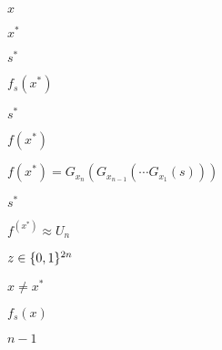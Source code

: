 \documentclass[10pt]{book}
\begin{document}
\begin{mdSnippets}
\begin{mdInlineSnippet}[9dd4e461268c8034f5c8564e155c67a6]%
$x$\end{mdInlineSnippet}%
\begin{mdInlineSnippet}[5d9075efa0ec4b2e8228505844f11742]%
$x^*$\end{mdInlineSnippet}%
\begin{mdInlineSnippet}[a4f30b4084dd8599723853c370c75cc9]%
$s^*$\end{mdInlineSnippet}%
\begin{mdInlineSnippet}[d05500aa6c9c5acde0f7847030f992fd]%
$f_s(x^*)$\end{mdInlineSnippet}%
\begin{mdInlineSnippet}[a4f30b4084dd8599723853c370c75cc9]%
$s^*$\end{mdInlineSnippet}%
\begin{mdInlineSnippet}[b2ff665e53fd029b9e15d9d06fa5e9f3]%
$f(x^*)$\end{mdInlineSnippet}%
\begin{mdInlineSnippet}%
$f(x^*) = G_{x_n}(G_{x_{n-1}}(\cdots G_{x_1}(s)))$\end{mdInlineSnippet}%
\begin{mdInlineSnippet}[a4f30b4084dd8599723853c370c75cc9]%
$s^*$\end{mdInlineSnippet}%
\begin{mdInlineSnippet}[296104cbd2b71c2b5c16c11e9c45a162]%
$f^(x^*) \approx U_n$\end{mdInlineSnippet}%
\begin{mdInlineSnippet}[d8d9fd5e4b4fc57a850dc6cd573edece]%
$z \in \{0,1\}^{2n}$\end{mdInlineSnippet}%
\begin{mdInlineSnippet}[c9233e03983076893b8ac6591e0638d1]%
$x \neq x^*$\end{mdInlineSnippet}%
\begin{mdInlineSnippet}%
$f_s(x)$\end{mdInlineSnippet}%
\begin{mdInlineSnippet}%
$n - 1$\end{mdInlineSnippet}%

\end{mdSnippets}
\end{document}
